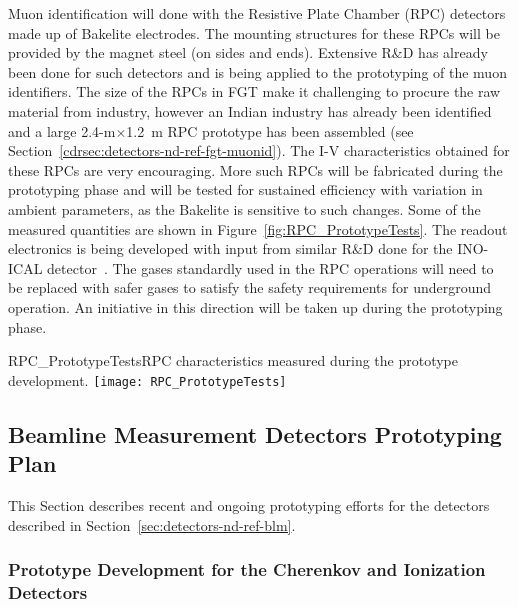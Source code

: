 Muon identification will done with the Resistive Plate Chamber (RPC)
detectors made up of Bakelite electrodes.  The mounting structures for these
RPCs will be provided by the magnet steel (on sides and ends). %
Extensive R\&D has already been done for such detectors and 
is being applied 
to the prototyping of the
muon identifiers. The size of the RPCs in FGT make it 
challenging to procure the raw material from industry, however an Indian 
industry has already been identified and a large 2.4-m$\times$1.2~m
RPC prototype has been assembled (see
Section~\ref{cdrsec:detectors-nd-ref-fgt-muonid}). The I-V
characteristics obtained for these RPCs are very encouraging. More such
RPCs will be fabricated during the prototyping phase and will be  
tested for sustained efficiency %
with variation
in ambient parameters, as the Bakelite is sensitive to such
changes. Some of the measured quantities are shown in
Figure~\ref{fig:RPC_PrototypeTests}.  The readout electronics is being
developed with input from similar R\&D done for the INO-ICAL
detector~\cite{1748-0221-7-10-P10003}. 
The gases standardly used in the RPC operations will need to be replaced with safer gases
to satisfy the safety requirements for underground operation. 
An initiative in
this direction will be taken up during the prototyping phase.
\begin{cdrfigure}
{RPC_PrototypeTests}{RPC characteristics measured during the prototype development.}
\texttt{[image: RPC\_PrototypeTests]}
\end{cdrfigure}



\subsection{Beamline Measurement Detectors Prototyping Plan}
\label{sec:proto-nd-blm}
This Section describes recent and ongoing prototyping efforts for the detectors described in Section~\ref{sec:detectors-nd-ref-blm}.


\subsubsection{Prototype Development for the Cherenkov and Ionization Detectors}
\label{subsec:proto-blm-muon-cherenkov-proto}

